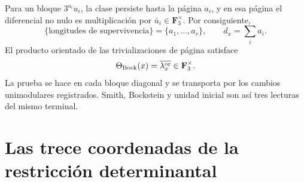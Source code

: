 Para un bloque \(3^{a_i}u_i\), la clase persiste hasta la página \(a_i\),
y en esa página el diferencial no nulo es multiplicación por
\(\bar u_i\in\mathbf F_3^\times\). Por consiguiente,
\begin{equation}\label{eq:detint-bock-longitudes}
 \{\text{longitudes de supervivencia}\}=\{a_1,\ldots,a_r\},
 \qquad
 d_x=\sum_i a_i.
\end{equation}
El producto orientado de las trivializaciones de página satisface
\begin{equation}\label{eq:detint-bock-leading}
 \Theta_{\rm Bock}(x)=\overline{\lambda_x^{\rm or}}
 \in\mathbf F_3^\times.
\end{equation}
La prueba se hace en cada bloque diagonal y se transporta por los cambios
unimodulares registrados. Smith, Bockstein y unidad inicial son así tres
lecturas del mismo terminal.

\iffalse
\section{Las trece coordenadas de la restricción determinantal}

